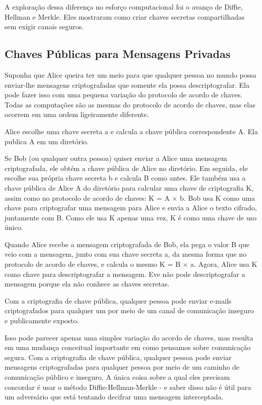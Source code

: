 \documentclass{book}
\begin{document}
A exploração dessa diferença no esforço computacional foi o avanço de Diffie, Hellman e Merkle. Eles mostraram como criar chaves secretas compartilhadas sem exigir canais seguros.


\subsection{Chaves Públicas para Mensagens Privadas}
\label{segredos:chaves-pub-mens-priv}

Suponha que Alice queira ter um meio para que qualquer pessoa no mundo possa enviar-lhe mensagens criptografadas que somente ela possa descriptografar. Ela pode fazer isso com uma pequena variação do protocolo de acordo de chaves. Todas as computações são as mesmas do protocolo de acordo de chaves, mas elas ocorrem em uma ordem ligeiramente diferente.

Alice escolhe uma chave secreta a e calcula a chave pública correspondente A. Ela publica A em um diretório.

Se Bob (ou qualquer outra pessoa) quiser enviar a Alice uma mensagem criptografada, ele obtém a chave pública de Alice no diretório. Em seguida, ele escolhe sua própria chave secreta b e calcula B como antes. Ele também usa a chave pública de Alice A do diretório para calcular uma chave de criptografia K, assim como no protocolo de acordo de chaves: K = A × b. Bob usa K como uma chave para criptografar uma mensagem para Alice e envia a Alice o texto cifrado, juntamente com B. Como ele usa K apenas uma vez, K é como uma chave de uso único.

Quando Alice recebe a mensagem criptografada de Bob, ela pega o valor B que veio com a mensagem, junto com sua chave secreta a, da mesma forma que no protocolo de acordo de chaves, e calcula o mesmo K = B × a. Agora, Alice usa K como chave para descriptografar a mensagem. Eve não pode descriptografar a mensagem porque ela não conhece as chaves secretas.

Com a criptografia de chave pública, qualquer pessoa pode enviar e-mails criptografados para qualquer um por meio de um canal de comunicação inseguro e publicamente exposto.

Isso pode parecer apenas uma simples variação do acordo de chaves, mas resulta em uma mudança conceitual importante em como pensamos sobre comunicação segura. Com a criptografia de chave pública, qualquer pessoa pode enviar mensagens criptografadas para qualquer pessoa por meio de um caminho de comunicação público e inseguro. A única coisa sobre a qual eles precisam concordar é usar o método Diffie-Hellman-Merkle - e saber disso não é útil para um adversário que está tentando decifrar uma mensagem interceptada.
\end{document}

